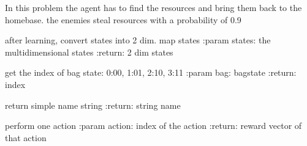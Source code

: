 \documentclass[letterpaper,10pt,english]{sphinxmanual}
\begin{document}

\begin{fulllineitems}
\label{Problems:morl_problems.MORLResourceGatheringProblem}
In this problem the agent has to find the resources and bring them back to the homebase.
the enemies steal resources with a probability of 0.9

\begin{fulllineitems}
\label{Problems:morl_problems.MORLResourceGatheringProblem.create_plottable_states}
after learning, convert states into 2 dim. map states
:param states: the multidimensional states
:return: 2 dim states

\end{fulllineitems}


\begin{fulllineitems}
\label{Problems:morl_problems.MORLResourceGatheringProblem.get_bag_index}
get the index of bag state: 0:00, 1:01, 2:10, 3:11
:param bag: bagstate
:return: index

\end{fulllineitems}


\begin{fulllineitems}
\label{Problems:morl_problems.MORLResourceGatheringProblem.name}
return simple name string
:return: string name

\end{fulllineitems}


\begin{fulllineitems}
\label{Problems:morl_problems.MORLResourceGatheringProblem.play}
perform one action
:param action: index of the action
:return: reward vector of that action


\end{fulllineitems}
\end{fulllineitems}
\end{document}
